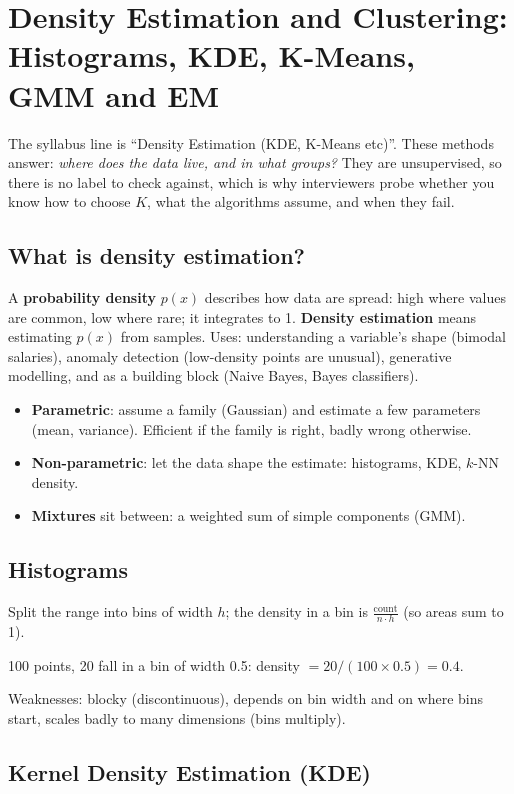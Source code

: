 \chapter{Density Estimation and Clustering: Histograms, KDE, K-Means, GMM and EM}

The syllabus line is ``Density Estimation (KDE, K-Means etc)''. These methods answer: \emph{where does the data live, and in what
groups?} They are unsupervised, so there is no label to check against, which is why interviewers probe whether you know how to choose
$K$, what the algorithms assume, and when they fail.

\section{What is density estimation?}
A \textbf{probability density} $p(x)$ describes how data are spread: high where values are common, low where rare; it integrates to 1.
\textbf{Density estimation} means estimating $p(x)$ from samples. Uses: understanding a variable's shape (bimodal salaries), anomaly
detection (low-density points are unusual), generative modelling, and as a building block (Naive Bayes, Bayes classifiers).
\begin{itemize}
\item \textbf{Parametric}: assume a family (Gaussian) and estimate a few parameters (mean, variance). Efficient if the family is right,
  badly wrong otherwise.
\item \textbf{Non-parametric}: let the data shape the estimate: histograms, KDE, $k$-NN density.
\item \textbf{Mixtures} sit between: a weighted sum of simple components (GMM).
\end{itemize}

\section{Histograms}
Split the range into bins of width $h$; the density in a bin is $\frac{\text{count}}{n\cdot h}$ (so areas sum to 1).
\begin{example}
100 points, 20 fall in a bin of width 0.5: density $= 20/(100\times0.5) = 0.4$.
\end{example}
Weaknesses: blocky (discontinuous), depends on bin width and on where bins start, scales badly to many dimensions (bins multiply).

\section{Kernel Density Estimation (KDE)}
